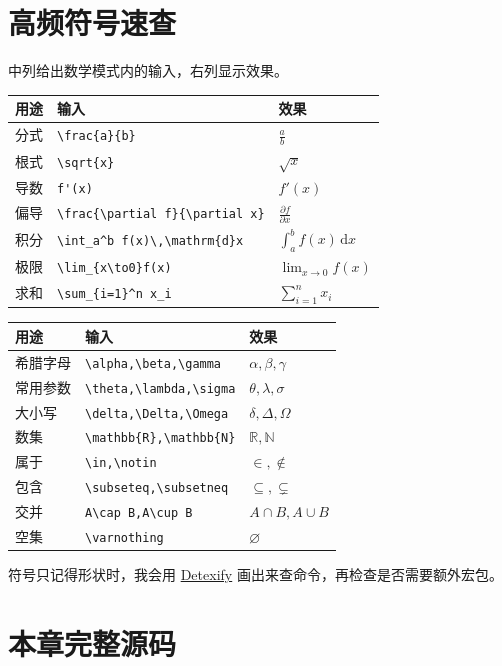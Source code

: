 \section{高频符号速查}
中列给出数学模式内的输入，右列显示效果。
\begin{center}
\begin{tabular}{lll}
\toprule
用途 & 输入 & 效果 \\
\midrule
分式 & \verb|\frac{a}{b}| & \(\frac ab\) \\
根式 & \verb|\sqrt{x}| & \(\sqrt{x}\) \\
导数 & \verb|f'(x)| & \(f'(x)\) \\
偏导 & \verb|\frac{\partial f}{\partial x}| & \(\frac{\partial f}{\partial x}\) \\
积分 & \verb|\int_a^b f(x)\,\mathrm{d}x| & \(\int_a^b f(x)\,\mathrm{d}x\) \\
极限 & \verb|\lim_{x\to0}f(x)| & \(\lim_{x\to0}f(x)\) \\
求和 & \verb|\sum_{i=1}^n x_i| & \(\sum_{i=1}^n x_i\) \\
\bottomrule
\end{tabular}
\end{center}
\begin{center}
\begin{tabular}{lll}
\toprule
用途 & 输入 & 效果 \\
\midrule
希腊字母 & \verb|\alpha,\beta,\gamma| & \(\alpha,\beta,\gamma\) \\
常用参数 & \verb|\theta,\lambda,\sigma| & \(\theta,\lambda,\sigma\) \\
大小写 & \verb|\delta,\Delta,\Omega| & \(\delta,\Delta,\Omega\) \\
数集 & \verb|\mathbb{R},\mathbb{N}| & \(\mathbb{R},\mathbb{N}\) \\
属于 & \verb|\in,\notin| & \(\in,\notin\) \\
包含 & \verb|\subseteq,\subsetneq| & \(\subseteq,\subsetneq\) \\
交并 & \verb|A\cap B,A\cup B| & \(A\cap B,A\cup B\) \\
空集 & \verb|\varnothing| & \(\varnothing\) \\
\bottomrule
\end{tabular}
\end{center}
符号只记得形状时，我会用 \href{https://detexify.kirelabs.org/}{Detexify}
画出来查命令，再检查是否需要额外宏包。

\section*{本章完整源码}
